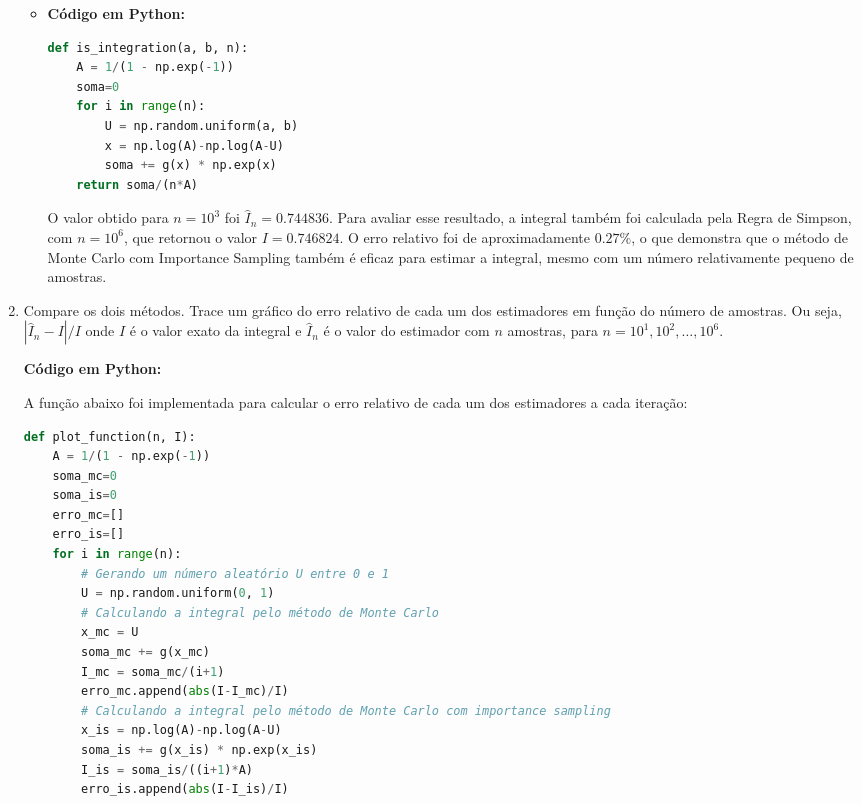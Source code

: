 \documentclass[12 pt]{article}
\begin{document}
\begin{enumerate}
\begin{tcolorbox}[colframe=black, title=Resposta (continuação):]
        \begin{itemize}
        \item \textbf{Código em Python:}
            
        \begin{lstlisting}[language=Python]
def is_integration(a, b, n):
    A = 1/(1 - np.exp(-1))
    soma=0
    for i in range(n):
        U = np.random.uniform(a, b)
        x = np.log(A)-np.log(A-U)
        soma += g(x) * np.exp(x)
    return soma/(n*A)
        \end{lstlisting}

        O valor obtido para $n=10^3$ foi \underline{$\hat{I}_n = 0.744836$}. Para avaliar esse resultado, a integral também foi calculada pela Regra de Simpson, com  $n=10^6$, que retornou o valor $I =  0.746824$. O erro relativo foi de aproximadamente $0.27\%$, o que demonstra que o método de Monte Carlo com Importance Sampling também é eficaz para estimar a integral, mesmo com um número relativamente pequeno de amostras.
        \end{itemize}
    \end{tcolorbox}

    \item Compare os dois métodos. Trace um gráfico do erro relativo de cada um dos estimadores em função do número de amostras. Ou seja, $|\hat{I}_n - I|/I$ onde $I$ é o valor exato da integral e $\hat{I}_n$ é o valor do estimador com $n$ amostras, para $n = 10^1, 10^2, \dots, 10^6$.
    \begin{tcolorbox}[colframe=black, title=Resposta:]

        \textbf{Código em Python:}

        A função abaixo foi implementada para calcular o erro relativo de cada um dos estimadores a cada iteração:
        \begin{lstlisting}[language=Python]
def plot_function(n, I):
    A = 1/(1 - np.exp(-1))
    soma_mc=0
    soma_is=0
    erro_mc=[]
    erro_is=[]
    for i in range(n):
        # Gerando um número aleatório U entre 0 e 1 
        U = np.random.uniform(0, 1)
        # Calculando a integral pelo método de Monte Carlo
        x_mc = U
        soma_mc += g(x_mc)
        I_mc = soma_mc/(i+1)
        erro_mc.append(abs(I-I_mc)/I)
        # Calculando a integral pelo método de Monte Carlo com importance sampling
        x_is = np.log(A)-np.log(A-U)
        soma_is += g(x_is) * np.exp(x_is)
        I_is = soma_is/((i+1)*A)
        erro_is.append(abs(I-I_is)/I)
        \end{lstlisting}


\end{tcolorbox}
\end{enumerate}
\end{document}

